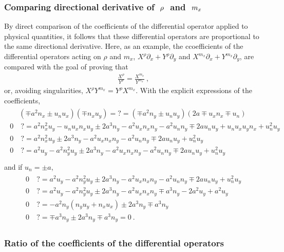 \documentclass[letterpaper,10pt,english]{jupyterBook}
\begin{document}
\subsubsection*{Comparing directional derivative of \protect\(\ \rho \ \protect\) and \protect\( \ m_x \ \protect\)}

\sphinxAtStartPar
By direct comparison of the coefficients of the differential operator applied to physical quantities, it follows that these differential operators are proportional to the same directional derivative. Here, as an example, the ccoefficients of the differential operators acting on \(\rho\) and \(m_x\), \(X^{\rho} \partial_x + Y^{\rho} \partial_y\) and \(X^{m_x} \partial_x + Y^{m_x} \partial_y\), are compared with the goal of proving that
\begin{equation*}
\begin{split}\frac{X^{\rho}}{Y^{\rho}} = \frac{X^{m_x}}{Y^{m_x}} \ ,\end{split}
\end{equation*}
\sphinxAtStartPar
or, avoiding singularities, \(X^{\rho} Y^{m_x} = Y^{\rho} X^{m_x}\). With the explicit expressions of the coefficients,
\begin{equation*}
\begin{split}\begin{aligned}
 & ( \mp a^2 n_x \pm u_n u_x ) ( \mp n_x u_y ) = ? = ( \mp a^2 n_y \pm u_n u_y ) ( 2 a \mp u_x n_x \mp u_n ) \\
 0 & \ ? = a^2 n_x^2 u_y - u_n u_x n_x u_y \pm 2 a^3 n_y - a^2 u_x n_x n_y - a^2 u_n n_y \mp 2a u_n u_y + u_n u_x u_y n_x + u_n^2 u_y \\
 0 & \ ? = a^2 n_x^2 u_y \pm 2 a^3 n_y - a^2 u_x n_x n_y - a^2 u_n n_y \mp 2a u_n u_y + u_n^2 u_y \\
 0 & \ ? = a^2 u_y - a^2 n_y^2 u_y \pm 2 a^3 n_y - a^2 u_x n_x n_y - a^2 u_n n_y \mp 2a u_n u_y + u_n^2 u_y \\
\end{aligned}\end{split}
\end{equation*}
\sphinxAtStartPar
and if \(u_n = \pm a\),
\begin{equation*}
\begin{split}\begin{aligned}
 0 & \ ? = a^2 u_y - a^2 n_y^2 u_y \pm 2 a^3 n_y - a^2 u_x n_x n_y - a^2 u_n n_y \mp 2a u_n u_y + u_n^2 u_y \\
 0 & \ ? = a^2 u_y - a^2 n_y^2 u_y \pm 2 a^3 n_y - a^2 u_x n_x n_y \mp a^3 n_y - 2a^2 u_y + a^2 u_y \\
 0 & \ ? =         - a^2 n_y ( n_y u_y + n_x u_x) \pm 2 a^3 n_y \mp a^3 n_y                      \\
 0 & \ ? =        \mp a^3 n_y                     \pm 2 a^3 n_y \mp a^3 n_y  = 0 \ .
\end{aligned}\end{split}
\end{equation*}\subsubsection*{Ratio of the coefficients of the differential operators}
\end{document}
